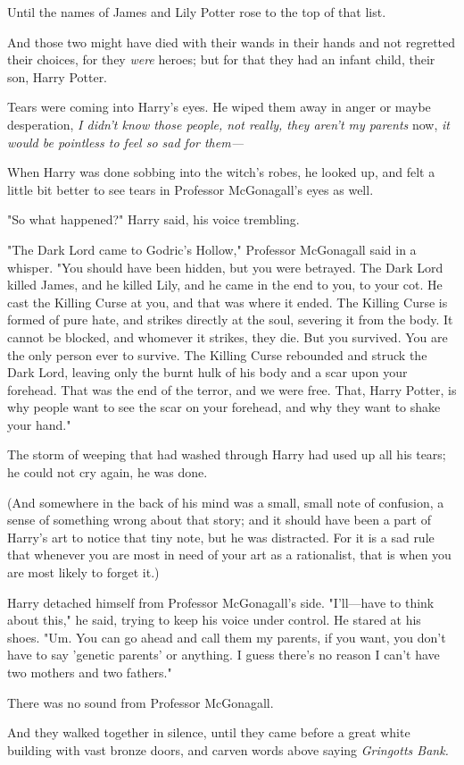 Until the names of James and Lily Potter rose to the top of that list.

And those two might have died with their wands in their hands and not regretted 
their choices, for they \emph{were} heroes; but for that they had an infant 
child, their son, Harry Potter.

Tears were coming into Harry's eyes. He wiped them away in anger or maybe 
desperation, \emph{I didn't know those people, not really, they aren't my 
parents} now,\emph{ it would be pointless to feel so sad for them---}

When Harry was done sobbing into the witch's robes, he looked up, and felt a 
little bit better to see tears in Professor McGonagall's eyes as well.

"So what happened?" Harry said, his voice trembling.

"The Dark Lord came to Godric's Hollow," Professor McGonagall said in a 
whisper. "You should have been hidden, but you were betrayed. The Dark Lord 
killed James, and he killed Lily, and he came in the end to you, to your cot. 
He cast the Killing Curse at you, and that was where it ended. The Killing 
Curse is formed of pure hate, and strikes directly at the soul, severing it 
from the body. It cannot be blocked, and whomever it strikes, they die. But you 
survived. You are the only person ever to survive. The Killing Curse rebounded 
and struck the Dark Lord, leaving only the burnt hulk of his body and a scar 
upon your forehead. That was the end of the terror, and we were free. That, 
Harry Potter, is why people want to see the scar on your forehead, and why they 
want to shake your hand."

The storm of weeping that had washed through Harry had used up all his tears; 
he could not cry again, he was done.

(And somewhere in the back of his mind was a small, small note of confusion, a 
sense of something wrong about that story; and it should have been a part of 
Harry's art to notice that tiny note, but he was distracted. For it is a sad 
rule that whenever you are most in need of your art as a rationalist, that is 
when you are most likely to forget it.)

Harry detached himself from Professor McGonagall's side. "I'll---have to think 
about this," he said, trying to keep his voice under control. He stared at his 
shoes. "Um. You can go ahead and call them my parents, if you want, you don't 
have to say 'genetic parents' or anything. I guess there's no reason I can't 
have two mothers and two fathers."

There was no sound from Professor McGonagall.

And they walked together in silence, until they came before a great white 
building with vast bronze doors, and carven words above saying \emph{Gringotts 
Bank.}
